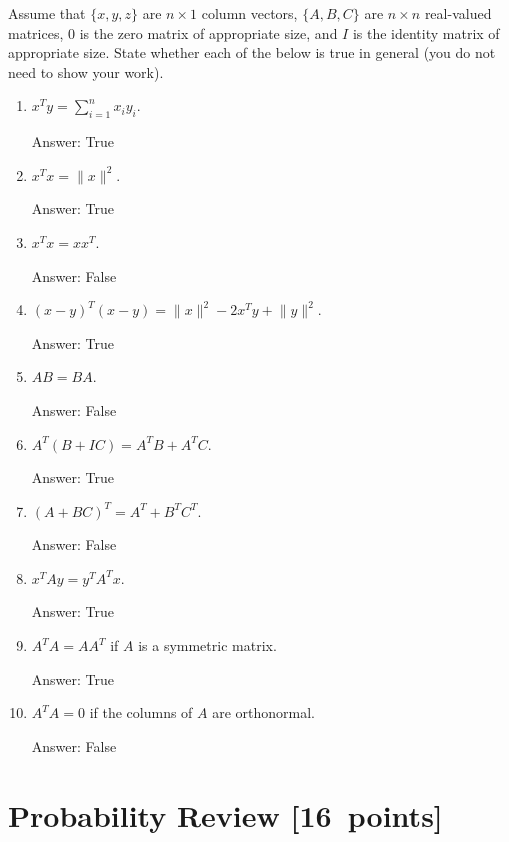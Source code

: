 \documentclass{article}
\newcommand{\blu}[1]{{\textcolor{blu}{#1}}}
\newenvironment{answer}{\par\begingroup\color{gre}Answer: }{\endgroup}
\let\ask\blu
\newcommand\pts[1]{\textcolor{pointscolour}{[#1~points]}}
\newcommand{\norm}[1]{\lVert #1 \rVert}
\begin{document}
  Assume that $\{x,y,z\}$ are $n \times 1$ column vectors, $\{A,B,C\}$ are $n \times n$ real-valued matrices, $0$ is the zero matrix of appropriate size, and $I$ is the identity matrix of appropriate size. \ask{State whether each of the below is true in general} (you do not need to show your work).

  \begin{enumerate}
  \item $x^Ty = \sum_{i=1}^n x_iy_i$.
  \begin{answer}
    True
  \end{answer}
  \item $x^Tx = \norm{x}^2$.
  \begin{answer}
    True
  \end{answer}
  \item $x^Tx = xx^T$.
  \begin{answer}
    False
  \end{answer}
  \item $(x-y)^T(x-y) = \norm{x}^2 - 2x^Ty + \norm{y}^2$.
  \begin{answer}
    True
  \end{answer}
  \item $AB=BA$.
  \begin{answer}
    False
  \end{answer}
  \item $A^T(B + IC) = A^TB + A^TC$.
  \begin{answer}
    True
  \end{answer}
  \item $(A + BC)^T = A^T + B^TC^T$.
  \begin{answer}
    False
  \end{answer}
  \item $x^TAy = y^TA^Tx$.
  \begin{answer}
    True
  \end{answer}
  \item $A^TA = AA^T$ if $A$ is a symmetric matrix.
  \begin{answer}
    True
  \end{answer}
  \item $A^TA = 0$ if the columns of $A$ are orthonormal.
  \begin{answer}
    False
  \end{answer}
  \end{enumerate}


  \clearpage\section{Probability Review \pts{16}}
\end{document}
